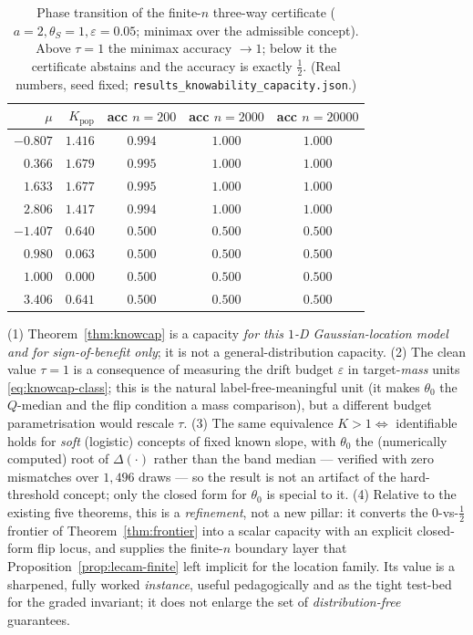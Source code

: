 \begin{table}[t]\centering\small
\begin{tabular}{rrccc}
\hline
$\mu$ & $K_{\mathrm{pop}}$ & acc $n{=}200$ & acc $n{=}2000$ & acc $n{=}20000$\\
\hline
$-0.807$ & $1.416$ & $0.994$ & $1.000$ & $1.000$\\
$\ \ 0.366$ & $1.679$ & $0.995$ & $1.000$ & $1.000$\\
$\ \ 1.633$ & $1.677$ & $0.995$ & $1.000$ & $1.000$\\
$\ \ 2.806$ & $1.417$ & $0.994$ & $1.000$ & $1.000$\\[2pt]
$-1.407$ & $0.640$ & $0.500$ & $0.500$ & $0.500$\\
$\ \ 0.980$ & $0.063$ & $0.500$ & $0.500$ & $0.500$\\
$\ \ 1.000$ & $0.000$ & $0.500$ & $0.500$ & $0.500$\\
$\ \ 3.406$ & $0.641$ & $0.500$ & $0.500$ & $0.500$\\
\hline
\end{tabular}
\caption{Phase transition of the finite-$n$ three-way certificate
($a{=}2,\theta_S{=}1,\varepsilon{=}0.05$; minimax over the admissible concept). Above
$\tau{=}1$ the minimax accuracy $\to1$; below it the certificate abstains and the
accuracy is exactly $\tfrac12$. (Real numbers, seed fixed;
\texttt{results\_knowability\_capacity.json}.)}
\label{tab:knowcap-phase}
\end{table}

\begin{remark}\label{rmk:knowcap-scope}
\textnormal{(1)} Theorem~\ref{thm:knowcap} is a capacity \emph{for this $1$-D
Gaussian-location model and for sign-of-benefit only}; it is not a
general-distribution capacity. \textnormal{(2)} The clean value $\tau=1$ is a
consequence of measuring the drift budget $\varepsilon$ in target-\emph{mass} units
\eqref{eq:knowcap-class}; this is the natural label-free-meaningful unit (it makes
$\theta_0$ the $Q$-median and the flip condition a mass comparison), but a different
budget parametrisation would rescale $\tau$. \textnormal{(3)} The same equivalence
$K>1\iff$ identifiable holds for \emph{soft} (logistic) concepts of fixed known
slope, with $\theta_0$ the (numerically computed) root of $\Delta(\cdot)$ rather than
the band median --- verified with zero mismatches over $1{,}496$ draws --- so the
result is not an artifact of the hard-threshold concept; only the closed form for
$\theta_0$ is special to it. \textnormal{(4)} Relative to the existing five
theorems, this is a \emph{refinement}, not a new pillar: it converts the
$0$-vs-$\tfrac12$ frontier of Theorem~\ref{thm:frontier} into a scalar capacity
with an explicit closed-form flip locus, and supplies the finite-$n$ boundary layer
that Proposition~\ref{prop:lecam-finite} left implicit for the location family. Its
value is a sharpened, fully worked \emph{instance}, useful pedagogically and as the
tight test-bed for the graded invariant; it does not enlarge the set of
\emph{distribution-free} guarantees.
\end{remark}
